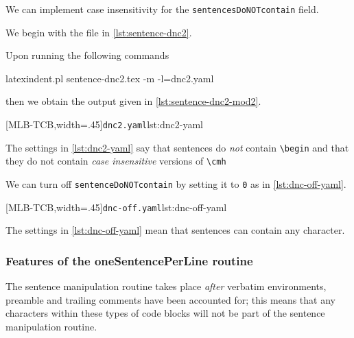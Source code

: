  \begin{example}
 We can implement case insensitivity for the \texttt{sentencesDoNOTcontain} field.

 We begin with the file in \cref{lst:sentence-dnc2}.


 Upon running the following commands

 \begin{commandshell}
latexindent.pl sentence-dnc2.tex -m -l=dnc2.yaml
\end{commandshell}

 then we obtain the output given in \cref{lst:sentence-dnc2-mod2}.

 \begin{cmhtcbraster}[ raster left skip=-2.5cm,
   raster right skip=-1cm,
   raster force size=false,
   raster column 1/.style={add to width=3cm},
  ]
  [MLB-TCB,width=.45\textwidth]{\texttt{dnc2.yaml}}{lst:dnc2-yaml}
 \end{cmhtcbraster}

 The settings in \cref{lst:dnc2-yaml} say that sentences do \emph{not} contain
 \lstinline!\begin! and that they do not contain \emph{case insensitive} versions of
 \lstinline!\cmh!
 \end{example}
 \begin{example}
 We can turn off \texttt{sentenceDoNOTcontain} by setting it to \texttt{0} as in \cref{lst:dnc-off-yaml}.

 [MLB-TCB,width=.45\textwidth]{\texttt{dnc-off.yaml}}{lst:dnc-off-yaml}

 The settings in \cref{lst:dnc-off-yaml} mean that sentences can contain any character.
 \end{example}

\subsubsection{Features of the oneSentencePerLine routine}
 The sentence manipulation routine takes place \emph{after} verbatim  environments, preamble and trailing comments have been
 accounted for; this means that any characters within these types of code blocks will not
 be part of the sentence manipulation routine.

